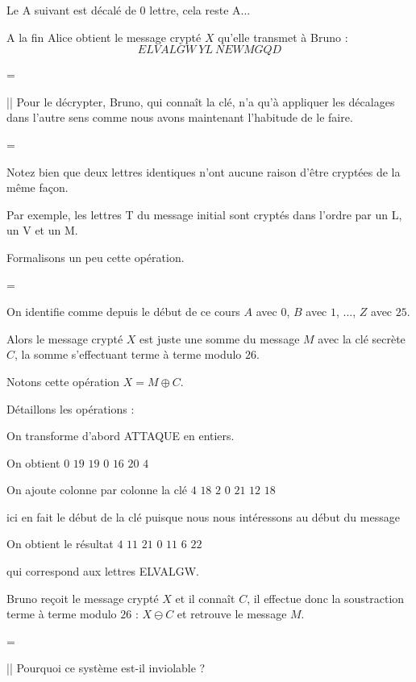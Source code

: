 Le A suivant est décalé de $0$ lettre, cela reste A...

\change

A la fin Alice obtient le message crypté $X$ qu'elle transmet à Bruno : 
$${ELVALGW \ YL \ NEWMGQD}$$

=

|| Pour le décrypter, Bruno, qui connaît la clé, n'a qu'à appliquer les décalages dans l'autre sens comme nous avons maintenant l'habitude de le faire.

=

Notez bien que deux lettres identiques n'ont aucune raison d'être cryptées de la même façon. 

Par exemple, les lettres T du message initial sont cryptés dans l'ordre par un L, un V et un M.


\diapo

Formalisons un peu cette opération. 

=

On identifie comme depuis le début de ce cours $A$ avec $0$, $B$ avec $1$, ..., $Z$ avec $25$.

\change

Alors le message crypté $X$ est juste une somme du message $M$ avec la clé secrète $C$, 
la somme s'effectuant terme à terme modulo $26$.


Notons cette opération $X=M \oplus C$.

\change

Détaillons les opérations : 

On transforme d'abord ATTAQUE en entiers.

On obtient $0$ $19$ $19$ $0$ $16$ $20$ $4$

\change

On ajoute colonne par colonne la clé $4$ $18$ $2$ $0$ $21$ $12$ $18$ 

ici en fait le début de la clé puisque nous nous intéressons au début du message

\change

On obtient le résultat $4$ $11$ $21$ $0$ $11$ $6$ $22$

qui correspond aux lettres ELVALGW.


\change

Bruno reçoit le message crypté $X$ et il connaît $C$, il effectue donc la soustraction terme à terme modulo $26$ :
$X \ominus C$ et retrouve le message $M$.

=

|| Pourquoi ce système est-il inviolable ? 

